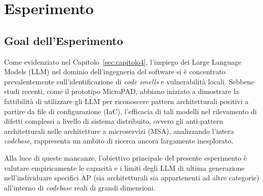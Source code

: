 
\chapter{Esperimento}

\section{Goal dell'Esperimento}

Come evidenziato nel Capitolo~\ref{sec:capitolo4}, l’impiego dei Large Language Models (LLM) nel dominio dell’ingegneria del software si è concentrato prevalentemente sull’identificazione di \textit{code smells} e vulnerabilità locali. Sebbene studi recenti, come il prototipo MicroPAD, abbiano iniziato a dimostrare la fattibilità di utilizzare gli LLM per riconoscere pattern architetturali positivi a partire da file di configurazione (IaC), l’efficacia di tali modelli nel rilevamento di difetti complessi a livello di sistema distribuito, ovvero gli anti-pattern architetturali nelle architetture a microservizi (MSA), analizzando l’intera \textit{codebase}, rappresenta un ambito di ricerca ancora largamente inesplorato.

Alla luce di queste mancanze, l'obiettivo principale del presente esperimento è valutare empiricamente le capacità e i limiti degli LLM di ultima generazione nell'individuare specifici AP (sia architetturali sia appartenenti ad altre categorie) all'interno di \textit{codebase} reali di grandi dimensioni.

